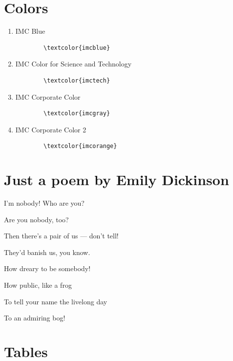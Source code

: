 \documentclass{imc-inf}
\begin{document}
\section{Colors}
\begin{enumerate}
\item \textcolor{imcblue}{IMC Blue}  
    \begin{verbatim}
        \textcolor{imcblue}
    \end{verbatim}
\item \textcolor{imctech}{IMC Color for Science and Technology}
    \begin{verbatim}
        \textcolor{imctech}
    \end{verbatim}
\item \textcolor{imcgray}{IMC Corporate Color}
\begin{verbatim}
        \textcolor{imcgray}
    \end{verbatim}
\item \textcolor{imcorange}{IMC Corporate Color 2}
\begin{verbatim}
        \textcolor{imcorange}
    \end{verbatim}
\end{enumerate}

\section {Just a poem by Emily Dickinson}

I'm nobody! Who are you?

Are you nobody, too?

Then there's a pair of us — don't tell!

They'd banish us, you know.

How dreary to be somebody!

How public, like a frog

To tell your name the livelong day

To an admiring bog!

\section{Tables}
\end{document}
